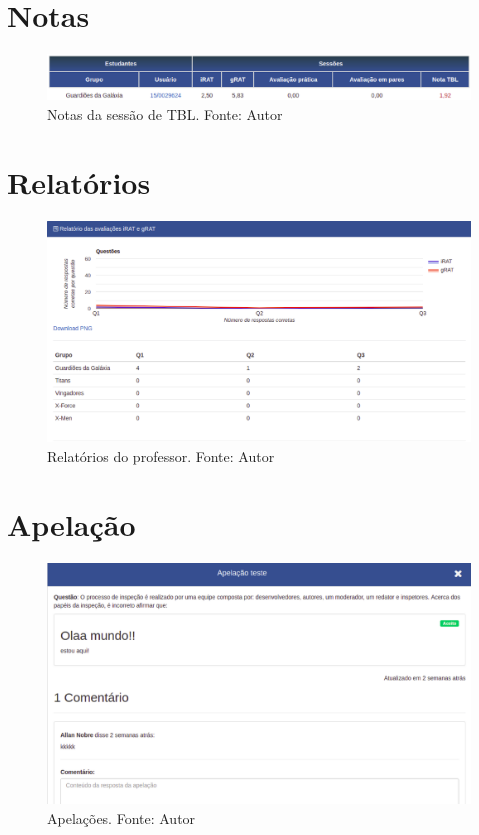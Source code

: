 \begin{apendicesenv}
\section{Notas}

\begin{figure}[h!]
	\centering
  \includegraphics[keepaspectratio=true,scale=0.42]{figuras/notas.eps}
  \caption[Notas da sessão de TBL]{Notas da sessão de TBL. Fonte: Autor}
	\label{fig:notas}
\end{figure}

\section{Relatórios}

\begin{figure}[H]
	\centering
  \includegraphics[keepaspectratio=true,scale=0.42]{figuras/relatorios.eps}
  \caption[Relatórios do professor]{Relatórios do professor. Fonte: Autor}
	\label{fig:relatorios}
\end{figure}

\section{Apelação}

\begin{figure}[h!]
	\centering
  \includegraphics[keepaspectratio=true,scale=0.42]{figuras/apelacao.eps}
  \caption[Apelações]{Apelações. Fonte: Autor}
	\label{fig:relatorios}
\end{figure}

\end{apendicesenv}
